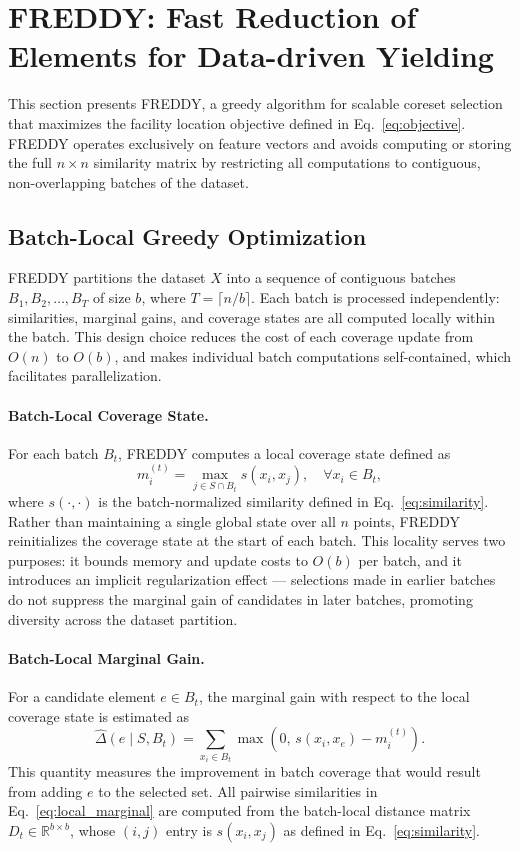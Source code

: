 \documentclass{article}
\begin{document}
\section{FREDDY: Fast Reduction of Elements for Data-driven Yielding}
\label{freddy}

This section presents FREDDY, a greedy algorithm for scalable coreset selection
that maximizes the facility location objective defined in Eq.~\eqref{eq:objective}.
FREDDY operates exclusively on feature vectors and avoids computing or storing
the full $n \times n$ similarity matrix by restricting all computations to
contiguous, non-overlapping batches of the dataset.

\subsection{Batch-Local Greedy Optimization}

FREDDY partitions the dataset $X$ into a sequence of contiguous batches
$B_1, B_2, \dots, B_T$ of size $b$, where $T = \lceil n/b \rceil$.
Each batch is processed independently: similarities, marginal gains, and coverage
states are all computed locally within the batch.
This design choice reduces the cost of each coverage update from $O(n)$ to $O(b)$,
and makes individual batch computations self-contained, which facilitates
parallelization.

\paragraph{Batch-Local Coverage State.}
For each batch $B_t$, FREDDY computes a local coverage state defined as
\begin{equation}
\label{eq:localmax}
m_i^{(t)} = \max_{j \in S \cap B_t} s(x_i, x_j), \quad \forall x_i \in B_t,
\end{equation}
where $s(\cdot,\cdot)$ is the batch-normalized similarity defined in
Eq.~\eqref{eq:similarity}.
Rather than maintaining a single global state over all $n$ points, FREDDY
reinitializes the coverage state at the start of each batch.
This locality serves two purposes: it bounds memory and update costs to $O(b)$
per batch, and it introduces an implicit regularization effect — selections made
in earlier batches do not suppress the marginal gain of candidates in later batches,
promoting diversity across the dataset partition.

\paragraph{Batch-Local Marginal Gain.}
For a candidate element $e \in B_t$, the marginal gain with respect to the local
coverage state is estimated as
\begin{equation}
\label{eq:local_marginal}
\widehat{\Delta}(e \mid S, B_t) =
\sum_{x_i \in B_t} \max\left(0,\, s(x_i, x_e) - m_i^{(t)}\right).
\end{equation}
This quantity measures the improvement in batch coverage that would result from
adding $e$ to the selected set.
All pairwise similarities in Eq.~\eqref{eq:local_marginal} are computed from the
batch-local distance matrix $D_t \in \mathbb{R}^{b \times b}$, whose $(i,j)$ entry
is $s(x_i, x_j)$ as defined in Eq.~\eqref{eq:similarity}.
\end{document}
